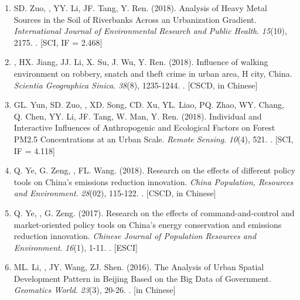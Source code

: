 \begin{enumerate}
\item
    SD. Zuo, \Shaoqing, YY. Li, JF. Tang, Y. Ren. (2018).
	Analysis of Heavy Metal Sources in the Soil of Riverbanks Across an Urbanization Gradient.
    \textit{International Journal of Environmental Research and Public Health}. \textit{15}(10), 2175.
    . [SCI, IF = 2.468]
\item
    \Shaoqing, HX. Jiang, JJ. Li, X. Su, J. Wu, Y. Ren. (2018).
	Influence of walking environment on robbery, snatch and theft crime in urban area, H city, China.
    \textit{Scientia Geographica Sinica}.  \textit{38}(8), 1235-1244.
    . [CSCD, in Chinese]
\item
    GL. Yun, SD. Zuo, \Shaoqing, XD. Song, CD. Xu, YL. Liao, PQ. Zhao, WY. Chang, Q. Chen, YY. Li, JF. Tang, W. Man, Y. Ren. (2018).
	Individual and Interactive Influences of Anthropogenic and Ecological Factors on Forest PM2.5 Concentrations at an Urban Scale.
    \textit{Remote Sensing}. \textit{10}(4), 521.
    . [SCI, IF = 4.118]
\item
    Q. Ye, G. Zeng, \Shaoqing, FL. Wang. (2018).
	Research on the effects of different policy tools on China’s emissions reduction innovation.
    \textit{China Population, Resources and Environment}. \textit{28}(02), 115-122.
    . [CSCD, in Chinese]
\item
    Q. Ye, \Shaoqing, G. Zeng. (2017).
	Research on the effects of command-and-control and market-oriented policy tools on China’s energy conservation and emissions reduction innovation.
    \textit{Chinese Journal of Population Resources and Environment}. \textit{16}(1), 1-11.
    . [ESCI]
\item
    ML. Li, \Shaoqing, JY. Wang, ZJ. Shen. (2016).
	The Analysis of Urban Spatial Development Pattern in Beijing Based on the Big Data of Government.
    \textit{Geomatics World}. \textit{23}(3), 20-26.
    . [in Chinese]
\end{enumerate}

